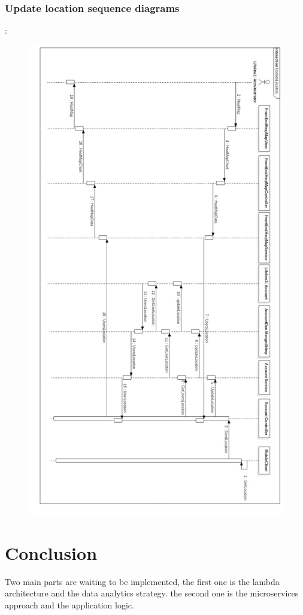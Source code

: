 \subsubsection{Update location sequence diagrams} :
\begin{figure}[h!]
	\centering
	\includegraphics[height=0.85\textheight]{fig01/UpdateLocation}
	\label{fig:FilialesEtClients}
\end{figure}
\newpage
\section{ Conclusion }
Two main parts are waiting to be implemented, the first one is the lambda architecture and the data analytics strategy. the second one is the microservices approach and the application logic.

